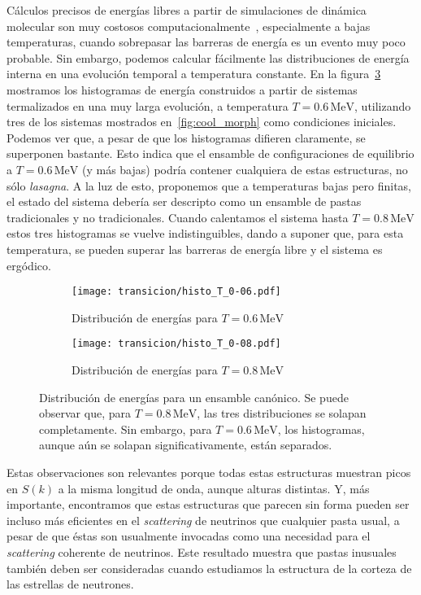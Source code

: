 Cálculos precisos de energías libres a partir de simulaciones de dinámica molecular son muy costosos computacionalmente~\cite[pp. 167-200]{frenkel_understanding_2001}, especialmente a bajas temperaturas, cuando sobrepasar las barreras de energía es un evento muy poco probable.
Sin embargo, podemos calcular fácilmente las distribuciones de energía interna en una evolución temporal a temperatura constante.
En la figura~\ref{fig:histo} mostramos los histogramas de energía construidos a partir de sistemas termalizados en una muy larga evolución, a temperatura $T=0.6\,\text{MeV}$, utilizando tres de los sistemas mostrados en~\ref{fig:cool_morph} como condiciones iniciales.
Podemos ver que, a pesar de que los histogramas difieren claramente, se superponen bastante.
Esto indica que el ensamble de configuraciones de equilibrio a $T=0.6\,\text{MeV}$ (y más bajas) podría contener cualquiera de estas estructuras, no sólo \emph{lasagna}.
A la luz de esto, proponemos que a temperaturas bajas pero finitas, el estado del sistema debería ser descripto como un ensamble de pastas tradicionales y no tradicionales.
Cuando calentamos el sistema hasta $T=0.8\,\text{MeV}$ estos tres histogramas se vuelve indistinguibles, dando a suponer que, para esta temperatura, se pueden superar las barreras de energía libre y el sistema es ergódico.

\begin{figure}[floatfix]%
  \centering
  \begin{subfigure}[h!]{0.45\columnwidth}
    \texttt{[image: transicion/histo\_T\_0-06.pdf]}
    \caption{Distribución de energías para $T=0.6\,\text{MeV}$}
\label{subfig:histo_T_0-06}
  \end{subfigure}
  \begin{subfigure}[h!]{0.45\columnwidth}
    \texttt{[image: transicion/histo\_T\_0-08.pdf]}
    \caption{Distribución de energías para $T=0.8\,\text{MeV}$}
\label{subfig:histo_T_0-08}
  \end{subfigure}
  \caption{Distribución de energías para un ensamble canónico.
    Se puede observar que, para $T=0.8\,\text{MeV}$, las tres distribuciones se solapan completamente.
    Sin embargo, para $T=0.6\,\text{MeV}$, los histogramas, aunque aún se solapan significativamente, están separados.}
\label{fig:histo}
\end{figure}

Estas observaciones son relevantes porque todas estas estructuras muestran picos en $S(k)$ a la misma longitud de onda, aunque alturas distintas.
Y, más importante, encontramos que estas estructuras que parecen sin forma pueden ser incluso más eficientes en el \emph{scattering} de neutrinos que cualquier pasta usual, a pesar de que éstas son usualmente invocadas como una necesidad para el \emph{scattering} coherente de neutrinos.
Este resultado muestra que pastas inusuales también deben ser consideradas cuando estudiamos la estructura de la corteza de las estrellas de neutrones.

